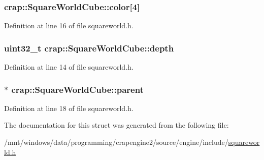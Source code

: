 \subsubsection[{color}]{ crap\+::\+Square\+World\+Cube\+::color\mbox{[}4\mbox{]}}\label{structcrap_1_1_square_world_cube_a40225fc4b5138dcb9b0fe58c882774c0}


Definition at line 16 of file squareworld.\+h.

\hypertarget{structcrap_1_1_square_world_cube_ace5f01b725ba2900714f1114e8d58ccf}{}
\subsubsection[{depth}]{\setlength{\rightskip}{0pt plus 5cm}uint32\+\_\+t crap\+::\+Square\+World\+Cube\+::depth}\label{structcrap_1_1_square_world_cube_ace5f01b725ba2900714f1114e8d58ccf}


Definition at line 14 of file squareworld.\+h.

\hypertarget{structcrap_1_1_square_world_cube_adf6b00d13203e191b4056f3e64f51582}{}
\subsubsection[{parent}]{$\ast$ crap\+::\+Square\+World\+Cube\+::parent}\label{structcrap_1_1_square_world_cube_adf6b00d13203e191b4056f3e64f51582}


Definition at line 18 of file squareworld.\+h.



The documentation for this struct was generated from the following file\+:\begin{DoxyCompactItemize}
\item 
/mnt/windows/data/programming/crapengine2/source/engine/include/\hyperlink{squareworld_8h}{squareworld.\+h}\end{DoxyCompactItemize}
